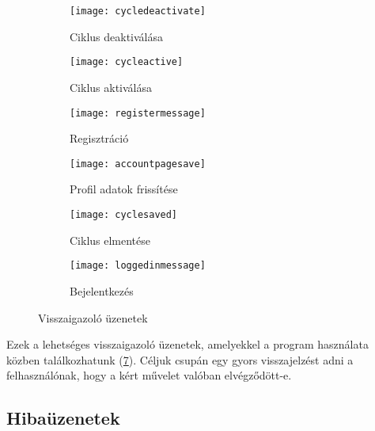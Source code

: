\begin{figure}[htbp]
	\medskip
	
	\begin{subfigure}[b]{0.3\textwidth}
			\centering
			\texttt{[image: cycledeactivate]}
			\caption{Ciklus deaktiválása}
			\label{fig:cycledeactivate}
	\end{subfigure}
	\hfill
	\begin{subfigure}[b]{0.3\textwidth}
			\centering
			\texttt{[image: cycleactive]}
			\caption{Ciklus aktiválása}
			\label{fig:cycleactive}
	\end{subfigure}
	\hfill
	\begin{subfigure}[b]{0.3\textwidth}
			\centering
			\texttt{[image: registermessage]}
			\caption{Regisztráció}
			\label{fig:registermessage}
	\end{subfigure}
	
	\medskip
	
	\begin{subfigure}[b]{0.3\textwidth}
			\centering
			\texttt{[image: accountpagesave]}
			\caption{Profil adatok frissítése}
			\label{fig:accountpagesave}
	\end{subfigure}
	\hfill
	\begin{subfigure}[b]{0.3\textwidth}
			\centering
			\texttt{[image: cyclesaved]}
			\caption{Ciklus elmentése}
			\label{fig:cyclesaved}
	\end{subfigure}
	\hfill
	\begin{subfigure}[b]{0.3\textwidth}
			\centering
			\texttt{[image: loggedinmessage]}
			\caption{Bejelentkezés}
			\label{fig:loggedinmessage}
	\end{subfigure}
	
	\caption{Visszaigazoló üzenetek}
	\label{fig:visszaigazolo}
\end{figure}

Ezek a lehetséges visszaigazoló üzenetek, amelyekkel a program használata közben találkozhatunk (\ref{fig:visszaigazolo}). Céljuk csupán egy gyors visszajelzést adni a felhasználónak, hogy a kért művelet valóban elvégződött-e.

\pagebreak

\subsection{Hibaüzenetek}

